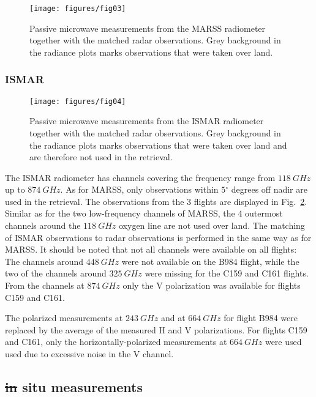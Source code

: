 \documentclass[journal abbreviation, manuscript]{copernicus}
\providecommand{\DIFadd}[1]{{\protect\color{blue}\uwave{#1}}} %
\providecommand{\DIFdel}[1]{{\protect\color{red}\sout{#1}}}                      %
\providecommand{\DIFaddbegin}{} %
\providecommand{\DIFaddend}{} %
\providecommand{\DIFdelbegin}{} %
\providecommand{\DIFdelend}{} %
\begin{document}
\begin{figure}[h!]
  \centering
  \texttt{[image: figures/fig03]}
  \caption{
    Passive microwave measurements from the MARSS radiometer together with the
    matched radar observations. Grey background in the radiance plots marks
    observations that were taken over land.
    }
  \label{fig:observations_marss}
\end{figure}


\subsubsection{ISMAR}

\begin{figure}[h!]
  \centering
  \texttt{[image: figures/fig04]}
  \caption{
    Passive microwave measurements from the ISMAR radiometer together with the
    matched radar observations. Grey background in the radiance plots marks
    observations that were taken over land and are therefore not used in
    the retrieval.
    }
  \label{fig:observations_ismar}
\end{figure}

The ISMAR radiometer has channels covering the frequency range from
$118\ \unit{GHz}$ up to $874\ \unit{GHz}$. As for MARSS, only observations
within $5\unit{^\circ}$ degrees off nadir are used in the retrieval. The
observations from the 3 flights are displayed in
Fig.~\ref{fig:observations_ismar}. Similar as for the two low-frequency
channels of MARSS, the 4 outermost channels around the $118\ \unit{GHz}$ oxygen
line are not used over land. The matching of ISMAR observations to radar
observations is performed in the same way as for MARSS. It should be noted that
not all channels were available on all flights: The channels around
$448\ \unit{GHz}$ were not available on the B984 flight, while the two of the
channels around $325\ \unit{GHz}$ were missing for the C159 and C161 flights.
From the channels at $874\ \unit{GHz}$ only the V polarization was available
for flights C159 and C161.

The polarized measurements at $243\ \unit{GHz}$ and at $664\ \unit{GHz}$ for
flight B984 were replaced by the average of the measured H and V polarizations.
For flights C159 and C161, only the horizontally-polarized measurements at
$664\ \unit{GHz}$ were used used due to excessive noise in the V channel.

\subsection{\DIFdelbegin \DIFdel{in }\DIFdelend \DIFaddbegin \DIFadd{In }\DIFaddend situ measurements}
\label{sec:in_situ}
\end{document}
